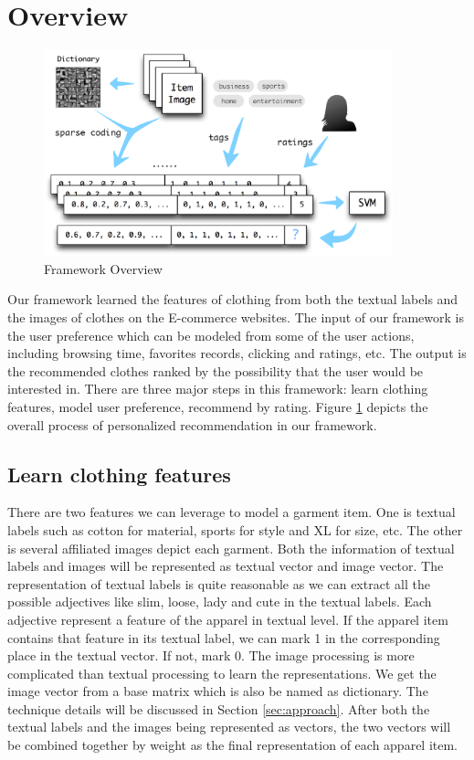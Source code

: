 \section{Overview}\label{sec:overview}

\begin{figure}
  \centering
  \includegraphics[width=0.9\textwidth]{framework}
  \caption{Framework Overview}
  \label{fig:overview}
\end{figure}

Our framework learned the features of clothing from both the textual labels and the images of clothes on the E-commerce websites. The input of our framework is the user preference which can be modeled from some of the user actions, including browsing time, favorites records, clicking and ratings, etc. The output is the recommended clothes ranked by the possibility that the user would be interested in. There are three major steps in this framework: learn clothing features, model user preference, recommend by rating. Figure \ref{fig:overview} depicts the overall process of personalized recommendation in our framework.

\subsection{Learn clothing features}
There are two features we can leverage to model a garment item. One is textual labels such as cotton for material, sports for style and XL for size, etc. The other is several affiliated images depict each garment. Both the information of textual labels and images will be represented as textual vector and image vector. The representation of textual labels is quite reasonable as we can extract all the possible adjectives like slim, loose, lady and cute in the textual labels. Each adjective represent a feature of the apparel in textual level. If the apparel item contains that feature in its textual label, we can mark 1 in the corresponding place in the textual vector. If not, mark 0. The image processing is more complicated than textual processing to learn the representations. We get the image vector from a base matrix which is also be named as dictionary. The technique details will be discussed in Section \ref{sec:approach}. After both the textual labels and the images being represented as vectors, the two vectors will be combined together by weight as the final representation of each apparel item.

